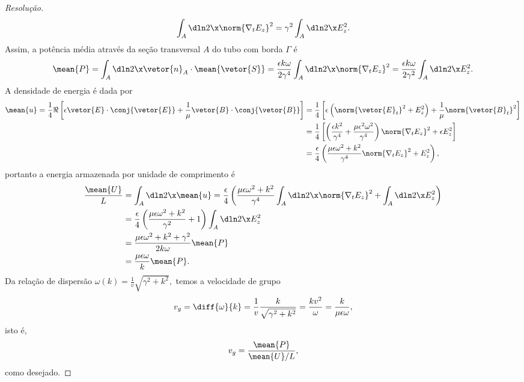 \begin{proof}[Resolução]
    \begin{equation*}
        \int_A \dln2\x \norm{\nabla_t E_z}^2 = \gamma^2 \int_A \dln2\x E_z^2.
    \end{equation*}
    Assim, a potência média através da seção transversal \(A\) do tubo com borda \(\Gamma\) é 
    \begin{equation*}
        \mean{P} = \int_A \dln2\x \vetor{n}_A \cdot \mean{\vetor{S}} 
        = \frac{\epsilon k \omega}{2 \gamma^4} \int_A \dln2\x \norm{\nabla_t E_z}^2
        = \frac{\epsilon k \omega}{2 \gamma^2} \int_A \dln2\x E_z^2.
    \end{equation*}
    A densidade de energia é dada por
    \begin{align*}
        \mean{u} = \frac14 \Re\left[\epsilon \vetor{E} \cdot \conj{\vetor{E}} + \frac{1}{\mu} \vetor{B} \cdot \conj{\vetor{B}}\right] 
        &= \frac14 \left[\epsilon \left(\norm{\vetor{E}_t}^2 + E_z^2\right) + \frac1{\mu} \norm{\vetor{B}_t}^2\right]\\
        &= \frac14 \left[\left(\frac{\epsilon k^2}{\gamma^4} + \frac{\mu\epsilon^2 \omega^2}{\gamma^4}\right)\norm{\nabla_t E_z}^2 + \epsilon E_z^2\right]\\
        &= \frac{\epsilon}{4} \left(\frac{\mu \epsilon \omega^2 + k^2}{\gamma^4}\norm{\nabla_t E_z}^2 + E_z^2\right),
    \end{align*}
    portanto a energia armazenada por unidade de comprimento é
    \begin{align*}
        \frac{\mean{U}}{L} &= \int_A \dln2\x \mean{u} = \frac{\epsilon}{4} \left(\frac{\mu \epsilon \omega^2 + k^2}{\gamma^4} \int_A \dln2\x \norm{\nabla_t E_z}^2 + \int_A \dln2\x E_z^2\right)\\
                           &= \frac{\epsilon}{4}\left(\frac{\mu \epsilon \omega^2 + k^2}{\gamma^2} + 1\right) \int_A \dln2\x E_z^2\\
                           &= \frac{\mu \epsilon \omega^2 + k^2 + \gamma^2}{2 k \omega} \mean{P}\\
                           &= \frac{\mu \epsilon \omega}{k} \mean{P}.
    \end{align*}
    Da relação de dispersão \(\omega(k) = \frac{1}{v}\sqrt{\gamma^2 + k^2},\) temos a velocidade de grupo 
    \begin{equation*}
        v_g = \diff{\omega}{k} = \frac{1}{v} \frac{k}{\sqrt{\gamma^2 + k^2}} = \frac{kv^2}{\omega} = \frac{k}{\mu \epsilon \omega},
    \end{equation*}
    isto é,
    \begin{equation*}
        v_g = \frac{\mean{P}}{\mean{U}/L},
    \end{equation*}
    como desejado.
\end{proof}
